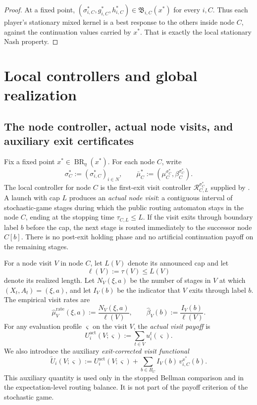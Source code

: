 \documentclass[12pt]{article}
\theoremstyle{definition}
\newcommand{\1}{\mathbf{1}}
\DeclareMathOperator{\BR}{BR}
\begin{document}
\begin{proof}
At a fixed point,
$(\sigma_{i,C}^*,g_{i,C}^*,h_{i,C}^*)\in\mathfrak B_{i,C}(x^*)$ for every $i,C$.
Thus each player's stationary mixed kernel is a best response to the others inside
node $C$, against the continuation values carried by $x^*$. That is exactly the
local stationary Nash property.
\end{proof}


\section{Local controllers and global realization}
\label{sec:realization}

\subsection{The node controller, actual node visits, and auxiliary exit certificates}

Fix a fixed point $x^*\in\BR_\eta(x^*)$. For each node $C$, write
\[
\sigma_C^*:=(\sigma_{i,C}^*)_{i\in N},
\qquad
\bar\mu_C^*:=(\mu_C^{\sigma_C^*},\beta_C^{\sigma_C^*}).
\]
The local controller for node $C$ is the first-exit visit controller
$\mathcal R_{C,L}^{\sigma_C^*}$ supplied by . A
launch with cap $L$ produces an \emph{actual node visit}: a contiguous interval
of stochastic-game stages during which the public routing automaton stays in the
node $C$, ending at the stopping time $\tau_{C,L}\le L$. If the visit exits
through boundary label $b$ before the cap, the next stage is routed immediately
to the successor node $C[b]$. There is no post-exit holding phase and no
artificial continuation payoff on the remaining stages.

For a node visit $V$ in node $C$, let $L(V)$ denote its announced cap and let
\[
\ell(V):=\tau(V)\le L(V)
\]
denote its realized length. Let $N_V(\xi,a)$ be the number of stages in $V$ at
which $(X_t,A_t)=(\xi,a)$, and let $I_V(b)$ be the indicator that $V$ exits
through label $b$. The empirical visit rates are
\[
\widehat\mu_V^{\mathrm{rate}}(\xi,a):=\frac{N_V(\xi,a)}{\ell(V)},
\qquad
\widehat\beta_V(b):=\frac{I_V(b)}{\ell(V)}.
\]
For any evaluation profile $\varsigma$ on the visit $V$, the \emph{actual visit
payoff} is
\begin{equation}
\label{eq:visit-actual-payoff}
U_i^{\mathrm{act}}(V;\varsigma)
:=
\sum_{t\in V} u_i^t(\varsigma).
\end{equation}
We also introduce the auxiliary \emph{exit-corrected visit functional}
\begin{equation}
\label{eq:visit-aux-payoff}
\widetilde U_i(V;\varsigma)
:=
U_i^{\mathrm{act}}(V;\varsigma)
+
\sum_{b\in B_C}I_V(b)\,v_{i,C}^{x^*}(b).
\end{equation}
This auxiliary quantity is used only in the stopped Bellman comparison and in
the expectation-level routing balance. It is not part of the payoff criterion
of the stochastic game.
\end{document}

